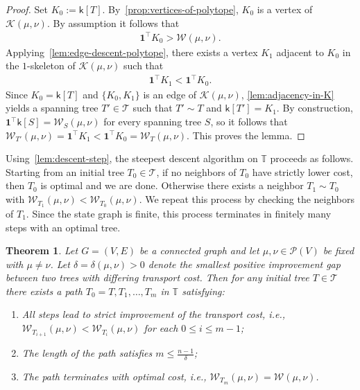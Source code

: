 \documentclass[11pt,a4paper]{article}
\newcommand{\prob}{{\mathscr{P}}}
\newcommand{\wass}{{\mathcal{W}}}
\newcommand{\setoftrees}{{\mathcal{T}}}
\newcommand{\stategraph}{{\mathbb{T}}}
\newcommand{\embedding}{{\mathsf{k}}}
\newcommand{\flowpoly}{{\mathcal{K}}}
\newtheorem{theorem}{Theorem}[section]
\begin{document}
\begin{proof}
    Set $K_0:=\embedding[T]$. By~\cref{prop:vertices-of-polytope}, $K_0$ is a vertex of $\flowpoly(\mu,\nu)$. By assumption it follows that
        \begin{align*}
            \mathbf{1}^{\top}K_0 > \wass(\mu,\nu).
        \end{align*}
    Applying~\cref{lem:edge-descent-polytope}, there exists a vertex $K_1$ adjacent to $K_0$ in the $1$-skeleton of $\flowpoly(\mu,\nu)$ such that
        \begin{align*}
            \mathbf{1}^{\top}K_1 < \mathbf{1}^{\top}K_0.
        \end{align*}
    Since $K_0=\embedding[T]$ and $\{K_0,K_1\}$ is an edge of $\flowpoly(\mu,\nu)$, \cref{lem:adjacency-in-K} yields a spanning tree $T'\in\setoftrees$ such that $T'\sim T$ and $\embedding[T']=K_1$. By construction, $\mathbf{1}^{\top}\embedding[S]=\wass_S(\mu,\nu)$ for every spanning tree $S$, so it follows that $\wass_{T'}(\mu,\nu)=\mathbf{1}^{\top}K_1<\mathbf{1}^{\top}K_0=\wass_T(\mu,\nu)$. This proves the lemma.
\end{proof}

Using~\cref{lem:descent-step}, the steepest descent algorithm on $\stategraph$ proceeds as follows. Starting from an initial tree $T_0\in\setoftrees$, if no neighbors of $T_0$ have strictly lower cost, then $T_0$ is optimal and we are done. Otherwise there exists a neighbor $T_1\sim T_0$ with $\wass_{T_1}(\mu,\nu) < \wass_{T_0}(\mu,\nu)$. We repeat this process by checking the neighbors of $T_1$. Since the state graph is finite, this process terminates in finitely many steps with an optimal tree. 

\begin{theorem}\label{thm:steepest-descent-convergence}
    Let $G=(V,E)$ be a connected graph and let $\mu,\nu\in\prob(V)$ be fixed with $\mu\ne \nu$. Let $\delta = \delta(\mu,\nu) > 0$ denote the smallest positive improvement gap between two trees with differing transport cost. Then for any initial tree $T\in\setoftrees$ there exists a path $T_0=T,T_1,\dotsc, T_{m}$ in $\stategraph$ satisfying:
        \begin{enumerate}
            \item All steps lead to strict improvement of the transport cost, i.e., $\wass_{T_{i+1}}(\mu,\nu) < \wass_{T_i}(\mu,\nu)$ for each $0\le i \le m-1$;
            \item The length of the path satisfies $m\leq \frac{n-1}{\delta}$;
            \item The path terminates with optimal cost, i.e., $\wass_{T_m}(\mu,\nu) = \wass(\mu,\nu)$.
        \end{enumerate}
\end{theorem}
\end{document}
